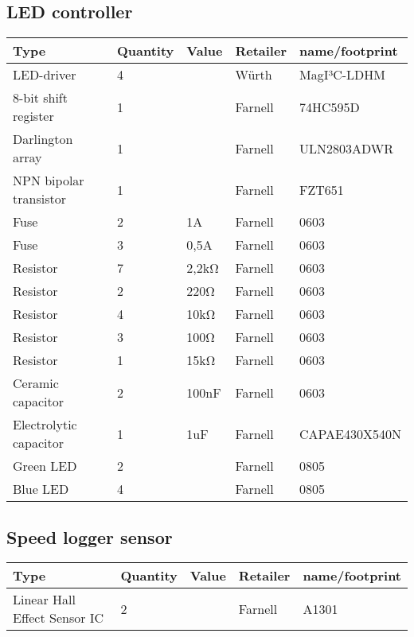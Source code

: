 \subsection{LED controller}
\begin{center}
\begin{tabularx}{\textwidth}{|X|l|l|l|l|}
    \hline
   \textbf{Type} & \textbf{Quantity} & \textbf{Value} & \textbf{Retailer} & \textbf{name/footprint} \\ \hline
    LED-driver & 4 &  & Würth & MagI³C-LDHM \\ \hline
    8-bit shift register & 1 &  & Farnell & 74HC595D \\ \hline
    Darlington array & 1 &  & Farnell & ULN2803ADWR \\ \hline
    NPN bipolar transistor & 1 &  & Farnell & FZT651   \\ \hline
    Fuse & 2 & 1A & Farnell & 0603 \\ \hline
    Fuse & 3 & 0,5A & Farnell & 0603 \\ \hline
    Resistor & 7 & 2,2kΩ & Farnell & 0603 \\ \hline
    Resistor & 2 & 220Ω & Farnell & 0603 \\ \hline
    Resistor & 4 & 10kΩ & Farnell & 0603\\ \hline
    Resistor & 3 & 100Ω & Farnell & 0603 \\ \hline
    Resistor & 1 & 15kΩ & Farnell & 0603  \\ \hline
    Ceramic capacitor & 2 & 100nF & Farnell & 0603 \\ \hline
    Electrolytic capacitor & 1 & 1uF & Farnell & CAPAE430X540N \\ \hline
    Green LED & 2 &  & Farnell & 0805 \\ \hline
    Blue LED & 4 &  & Farnell & 0805 \\ \hline
	\end{tabularx}
\end{center}

\subsection{Speed logger sensor}
\begin{center}
\begin{tabularx}{\textwidth}{|X|l|l|l|l|}
    \hline
   \textbf{Type} & \textbf{Quantity} & \textbf{Value} & \textbf{Retailer} & \textbf{name/footprint} \\ \hline
    Linear Hall Effect Sensor IC & 2 &  & Farnell & A1301 \\ \hline
	\end{tabularx}
\end{center}

